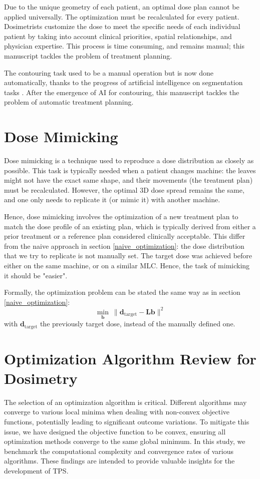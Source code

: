 Due to the unique geometry of each patient, an optimal dose plan cannot be applied universally.
The optimization must be recalculated for every patient.
Dosimetrists customize the dose to meet the specific needs of each individual patient by taking into account clinical priorities, spatial relationships, and physician expertise.
This process is time consuming, and remains manual; this manuscript tackles the problem of treatment planning.

The contouring task used to be a manual operation but is now done automatically, thanks to the progress of artificial intelligence on segmentation tasks \cite{Kim2024} \cite{Duan2022}.
After the emergence of AI for contouring, this manuscript tackles the problem of automatic treatment planning.

\section{Dose Mimicking}
Dose mimicking is a technique used to reproduce a dose distribution as closely as possible.
This task is typically needed when a patient changes machine: the leaves might not have the exact same shape, and their movements (the treatment plan) must be recalculated.
However, the optimal 3D dose spread remains the same, and one only needs to replicate it (or mimic it) with another machine.

Hence, dose mimicking involves the optimization of a new treatment plan to match the dose profile of an existing plan, which is typically derived from either a prior treatment or a reference plan considered clinically acceptable.
This differ from the naive approach in section \ref{naive_optimization}: the dose distribution that we try to replicate is not manually set.
The target dose was achieved before either on the same machine, or on a similar MLC.
Hence, the task of mimicking it should be "easier".

Formally, the optimization problem can be stated the same way as in section \ref{naive_optimization}:
$$ \min_\mathbf{b} \ \| \mathbf{d}_{\text{target}} - \textbf{L}\mathbf{b} \|^2 $$
with $\mathbf{d}_{\text{target}}$ the previously target dose, instead of the manually defined one.

\section{Optimization Algorithm Review for Dosimetry}
The selection of an optimization algorithm is critical.
Different algorithms may converge to various local minima when dealing with non-convex objective functions, potentially leading to significant outcome variations.
To mitigate this issue, we have designed the objective function to be convex, ensuring all optimization methods converge to the same global minimum.
In this study, we benchmark the computational complexity and convergence rates of various algorithms.
These findings are intended to provide valuable insights for the development of TPS.

